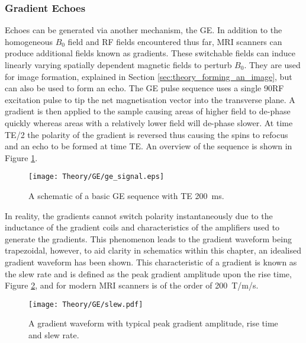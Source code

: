 \subsubsection{Gradient Echoes}
\label{subsubsec:theory_ge}
Echoes can be generated via another mechanism, the \ac{GE}. In addition to the homogeneous $B_0$ field and \ac{RF} fields encountered thus far, \ac{MRI} scanners can produce additional fields known as gradients. These switchable fields can induce linearly varying spatially dependent magnetic fields to perturb $B_0$. They are used for image formation, explained in Section \ref{sec:theory_forming_an_image}, but can also be used to form an echo. The \ac{GE} pulse sequence uses a single 90\degree{ }\ac{RF} excitation pulse to tip the net magnetisation vector into the transverse plane. A gradient is then applied to the sample causing areas of higher field to de-phase quickly whereas areas with a relatively lower field will de-phase slower. At time \ac{TE}/2 the polarity of the gradient is reversed thus causing the spins to refocus and an echo to be formed at time \ac{TE}. An overview of the sequence is shown in Figure \ref{fig:theory_ge_signal}. 

\begin{figure}[H]
	\centering
	\texttt{[image: Theory/GE/ge\_signal.eps]}
	\caption{A schematic of a basic \acf{GE} sequence with \ac{TE} 200~ms.}
	\label{fig:theory_ge_signal}	
\end{figure}

In reality, the gradients cannot switch polarity instantaneously due to the inductance of the gradient coils and characteristics of the amplifiers used to generate the gradients. This phenomenon leads to the gradient waveform being trapezoidal, however, to aid clarity in schematics within this chapter, an idealised gradient waveform has been shown. This characteristic of a gradient is known as the slew rate and is defined as the peak gradient amplitude upon the rise time, Figure \ref{fig:theory_slew}, and for modern \ac{MRI} scanners is of the order of 200~T/m/s.

\begin{figure}[H]
	\centering
	\texttt{[image: Theory/GE/slew.pdf]}
	\caption{A gradient waveform with typical peak gradient amplitude, rise time and slew rate.}
	\label{fig:theory_slew}	
\end{figure}


